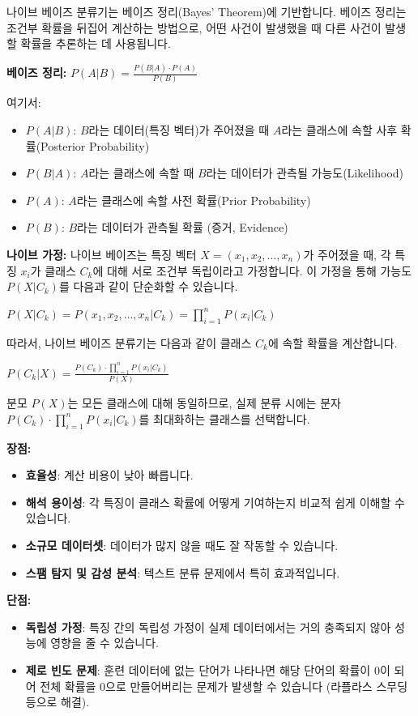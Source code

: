 \documentclass[11pt,a4paper]{article}
\theoremstyle{definition}
\begin{document}
나이브 베이즈 분류기는 베이즈 정리(Bayes' Theorem)에 기반합니다. 베이즈 정리는 조건부 확률을 뒤집어 계산하는 방법으로, 어떤 사건이 발생했을 때 다른 사건이 발생할 확률을 추론하는 데 사용됩니다.

\textbf{베이즈 정리:}
$P(A|B) = \frac{P(B|A) \cdot P(A)}{P(B)}$

여기서:
\begin{itemize}
    \item $P(A|B)$: $B$라는 데이터(특징 벡터)가 주어졌을 때 $A$라는 클래스에 속할 사후 확률(Posterior Probability)
    \item $P(B|A)$: $A$라는 클래스에 속할 때 $B$라는 데이터가 관측될 가능도(Likelihood)
    \item $P(A)$: $A$라는 클래스에 속할 사전 확률(Prior Probability)
    \item $P(B)$: $B$라는 데이터가 관측될 확률 (증거, Evidence)
\end{itemize}

\textbf{나이브 가정:}
나이브 베이즈는 특징 벡터 $X = (x_1, x_2, \dots, x_n)$가 주어졌을 때, 각 특징 $x_i$가 클래스 $C_k$에 대해 서로 조건부 독립이라고 가정합니다. 이 가정을 통해 가능도 $P(X|C_k)$를 다음과 같이 단순화할 수 있습니다.

$P(X|C_k) = P(x_1, x_2, \dots, x_n | C_k) = \prod_{i=1}^{n} P(x_i | C_k)$

따라서, 나이브 베이즈 분류기는 다음과 같이 클래스 $C_k$에 속할 확률을 계산합니다.

$P(C_k|X) = \frac{P(C_k) \cdot \prod_{i=1}^{n} P(x_i | C_k)}{P(X)}$

분모 $P(X)$는 모든 클래스에 대해 동일하므로, 실제 분류 시에는 분자 $P(C_k) \cdot \prod_{i=1}^{n} P(x_i | C_k)$를 최대화하는 클래스를 선택합니다.

\textbf{장점:}
\begin{itemize}
    \item \textbf{효율성}: 계산 비용이 낮아 빠릅니다.
    \item \textbf{해석 용이성}: 각 특징이 클래스 확률에 어떻게 기여하는지 비교적 쉽게 이해할 수 있습니다.
    \item \textbf{소규모 데이터셋}: 데이터가 많지 않을 때도 잘 작동할 수 있습니다.
    \item \textbf{스팸 탐지 및 감성 분석}: 텍스트 분류 문제에서 특히 효과적입니다.
\end{itemize}

\textbf{단점:}
\begin{itemize}
    \item \textbf{독립성 가정}: 특징 간의 독립성 가정이 실제 데이터에서는 거의 충족되지 않아 성능에 영향을 줄 수 있습니다.
    \item \textbf{제로 빈도 문제}: 훈련 데이터에 없는 단어가 나타나면 해당 단어의 확률이 0이 되어 전체 확률을 0으로 만들어버리는 문제가 발생할 수 있습니다 (라플라스 스무딩 등으로 해결).
\end{itemize}
\end{document}

